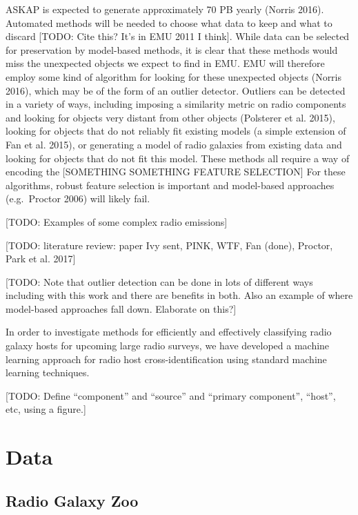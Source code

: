 \documentclass[fleqn,usenatbib,usedcolumn]{mnras}
\begin{document}
  ASKAP is expected to generate approximately 70 PB yearly (Norris 2016).
  Automated methods will be needed to choose what data to keep and what to
  discard {[}TODO: Cite this? It's in EMU 2011 I think{]}. While data can
  be selected for preservation by model-based methods, it is clear that
  these methods would miss the unexpected objects we expect to find in
  EMU. EMU will therefore employ some kind of algorithm for looking for
  these unexpected objects (Norris 2016), which may be of the form of an
  outlier detector. Outliers can be detected in a variety of ways,
  including imposing a similarity metric on radio components and looking
  for objects very distant from other objects (Polsterer et al. 2015),
  looking for objects that do not reliably fit existing models (a simple
  extension of Fan et al. 2015), or generating a model of radio galaxies
  from existing data and looking for objects that do not fit this model.
  These methods all require a way of encoding the {[}SOMETHING SOMETHING
  FEATURE SELECTION{]} For these algorithms, robust feature selection is
  important and model-based approaches (e.g.~Proctor 2006) will likely
  fail.

  {[}TODO: Examples of some complex radio emissions{]}

  {[}TODO: literature review: paper Ivy sent, PINK, WTF, Fan (done),
  Proctor, Park et al. 2017{]}

  {[}TODO: Note that outlier detection can be done in lots of different
  ways including with this work and there are benefits in both. Also an
  example of where model-based approaches fall down. Elaborate on this?{]}

  In order to investigate methods for efficiently and effectively
  classifying radio galaxy hosts for upcoming large radio surveys, we have
  developed a machine learning approach for radio host
  cross-identification using standard machine learning techniques.

  {[}TODO: Define ``component'' and ``source'' and ``primary component'',
  ``host'', etc, using a figure.{]}

\section{Data}\label{data}

  \subsection{Radio Galaxy Zoo}\label{radio-galaxy-zoo}
\end{document}

